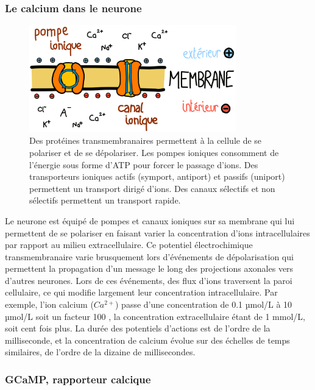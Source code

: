 \subsubsection{Le calcium dans le neurone}

\begin{figure}
  \centering
  \includegraphics[width=0.8\textwidth]{./files/membrane.svg.png}
  \caption{Des protéines transmembranaires permettent à la cellule de se polariser et de se dépolariser. Les pompes ioniques consomment de l'énergie sous forme d'ATP pour forcer le passage d'ions. Des transporteurs ioniques actifs (symport, antiport) et passifs (uniport) permettent un transport dirigé d'ions. Des canaux sélectifs et non sélectifs permettent un transport rapide.}
  \end{figure}

Le neurone est équipé de pompes et canaux ioniques sur sa membrane qui lui permettent de se polariser en faisant varier la concentration d'ions intracellulaires par rapport au milieu extracellulaire. Ce potentiel électrochimique transmembranaire varie brusquement lors d'événements de dépolarisation qui permettent la propagation d'un message le long des projections axonales vers d'autres neurones. Lors de ces événements, des flux d'ions traversent la paroi cellulaire, ce qui modifie largement leur concentration intracellulaire. Par exemple, l'ion calcium ($Ca^{2+}$) passe d'une concentration de 0.1 µmol/L à 10 µmol/L soit un facteur 100 \cite{grienberger_imaging_2012}, la concentration extracellulaire étant de 1 mmol/L, soit cent fois plus. La durée des potentiels d'actions est de l'ordre de la milliseconde, et la concentration de calcium évolue sur des échelles de temps similaires, de l'ordre de la dizaine de millisecondes. %

\subsubsection{GCaMP, rapporteur calcique}

